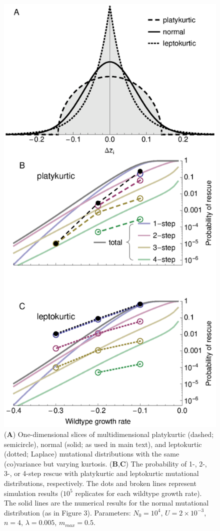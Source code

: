 \documentclass[9pt,twocolumn,twoside]{../main/gsajnl}
\begin{document}
\begin{figure}[htbp]
\centering
\includegraphics[width=\linewidth]{FigureS3.eps}
\caption{
(\textbf{A}) One-dimensional slices of multidimensional platykurtic (dashed; semicircle), normal (solid; as used in main text), and leptokurtic (dotted; Laplace) mutational distributions with the same (co)variance but varying kurtosis.
(\textbf{B},\textbf{C}) The probability of 1-, 2-, 3-, or 4-step rescue with platykurtic and leptokurtic mutational distributions, respectively.
The dots and broken lines represent simulation results ($10^5$ replicates for each wildtype growth rate).
The solid lines are the numerical results for the normal mutational distribution (as in Figure 3).
Parameters: $N_0=10^4$, $U=2\times 10^{-3}$, $n=4$, $\lambda=0.005$, $m_{max}=0.5$.
}%
\label{fig:lepto_platy_prob}
\end{figure}
\end{document}
